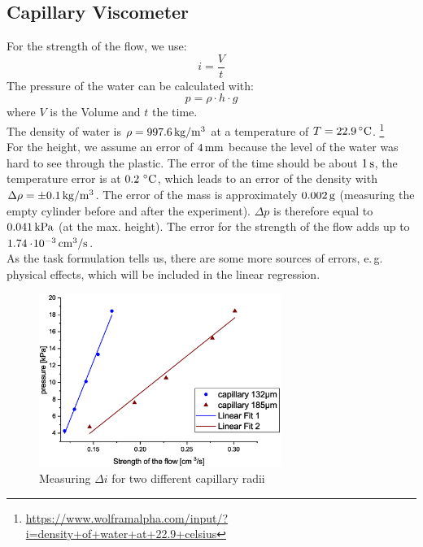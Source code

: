 \subsection{Capillary Viscometer} \label{sec:aufgabe3}
For the strength of the flow, we use:
\begin{equation}
i = \frac{V}{t}
\end{equation}
The pressure of the water can be calculated with:
\begin{equation}
p = \rho \cdot h \cdot g
\end{equation}
where $V$ is the Volume and $t$ the time.\\
The density of water is $\rho = \unit[997.6]{kg/m^3}$ at a temperature of $T = 22.9 \C$.%
\footnote{\url{https://www.wolframalpha.com/input/?i=density+of+water+at+22.9+celsius}}\\
For the height, we assume an error of $\unit[4]{mm}$ because the level of the water was hard to see through the plastic. The error of the time should be about $\unit[1]{s}$, the temperature error is at $\unit[0.2]{\C}$, which leads to an error of the density with $\Delta \rho = \pm \unit[0.1]{kg/m^3}$. The error of the mass is approximately $\unit[0.002]{g}$ (measuring the empty cylinder before and after the experiment). $\Delta p$ is therefore equal to $\unit[0.041]{kPa}$ (at the max. height).
The error for the strength of the flow adds up to $\unit[1.74\e{-3}]{cm^3/s}$.\\As the task formulation tells us, there are some more sources of errors, e.\,g. physical effects, which will be included in the linear regression.

\begin{figure}
\begin{center}
\includegraphics[width=0.7\textwidth]{Bilder/aufgabe2.eps}
\caption{Measuring $\Delta i$ for two different capillary radii}
\label{fig:aufgabe2}
\end{center}
\end{figure}

